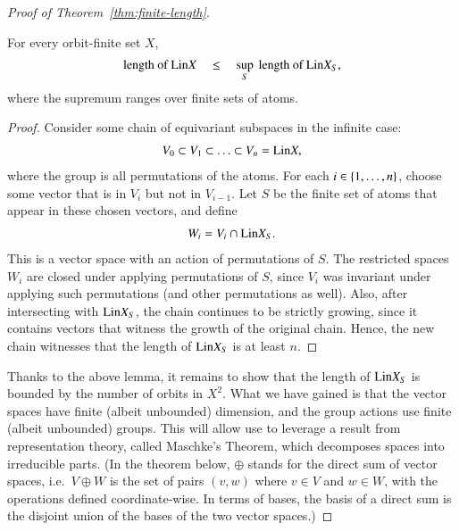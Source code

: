 \begin{proof}[Proof of Theorem~\ref{thm:finite-length}]
    \begin{lemma}
        For every orbit-finite set $X$,
        \begin{align*}
        \text{length of }\mathrm{Lin} X
        \quad \leq \quad  \sup_S \text{\ length of }\mathrm{Lin} {X_S},
        \end{align*}
        where the supremum ranges over finite sets of atoms.
    \end{lemma}
    \begin{proof}
        Consider some chain of equivariant subspaces in the infinite case: 
        \begin{align*}
        V_0 \subset V_1 \subset \ldots \subset V_n = \mathrm{Lin} X,
        \end{align*}
        where the group is all permutations of the atoms.
        For each $i \in \{1,\ldots,n\}$, choose some vector  that is in $V_i$ but not in $V_{i-1}$. Let $S$ be the finite set of atoms that appear in these chosen vectors, and define 
        \begin{align*}
        W_i = V_i \cap \mathrm{Lin} X_S.
        \end{align*}
        This is a vector space with an action of permutations of $S$.
        The restricted  spaces $W_i$ are  closed under applying permutations of $S$, since $V_i$ was invariant under applying such permutations (and other permutations as well). Also, after intersecting with $\mathrm{Lin} X_S$, the chain continues to be strictly growing, since it contains vectors that witness the growth of the original chain. Hence, the new chain  witnesses that the length of $\mathrm{Lin} X_S$ is at least $n$. 
    \end{proof}

    Thanks to the above lemma, it remains to show that the length of $\mathrm{Lin} X_S$ is bounded by the number of orbits in $X^2$. What we have gained is that the vector spaces have finite (albeit unbounded) dimension, and the group actions use finite (albeit unbounded) groups. This will allow use to leverage a result from representation theory, called Maschke's Theorem, which decomposes  spaces  into irreducible parts.  (In the theorem below, $\oplus$ stands for the direct sum of vector spaces, i.e.~$V \oplus W$ is the set of pairs $(v,w)$ where $v \in V$ and $w \in W$, with the operations defined coordinate-wise. In terms of bases, the basis of a direct sum is the disjoint union of the bases of the two vector spaces.)


\end{proof}
